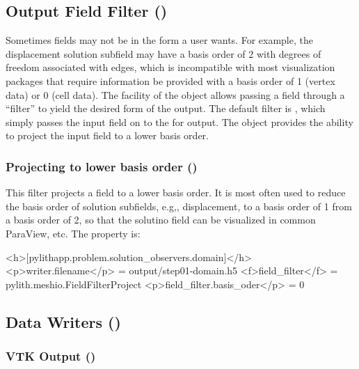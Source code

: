 \subsection{Output Field Filter ()}

Sometimes fields may not be in the form a user wants. For example, the
displacement solution subfield may have a basis order of 2 with
degrees of freedom associated with edges, which is incompatible with
most visualization packages that require information be provided with
a basis order of 1 (vertex data) or 0 (cell data). The
 facility of the  object
allows passing a field through a ``filter'' to yield the desired form
of the output. The default filter is , which
simply passes the input field on to the  for
output. The  object provides the ability to
project the input field to a lower basis order.

\subsubsection{Projecting to lower basis order ()}

This filter projects a field to a lower basis order. It is most often
used to reduce the basis order of solution subfields, e.g,,
displacement, to a basis order of 1 from a basis order of 2, so that
the solutino field can be visualized in common ParaView, etc.
The  property is:
\begin{inventory}
\end{inventory}

\begin{cfg}
<h>[pylithapp.problem.solution_observers.domain]</h>
<p>writer.filename</p> = output/step01-domain.h5
<f>field_filter</f> = pylith.meshio.FieldFilterProject
<p>field_filter.basis_oder</p> = 0
\end{cfg}


\subsection{Data Writers ()}

\subsubsection{VTK Output ()}

